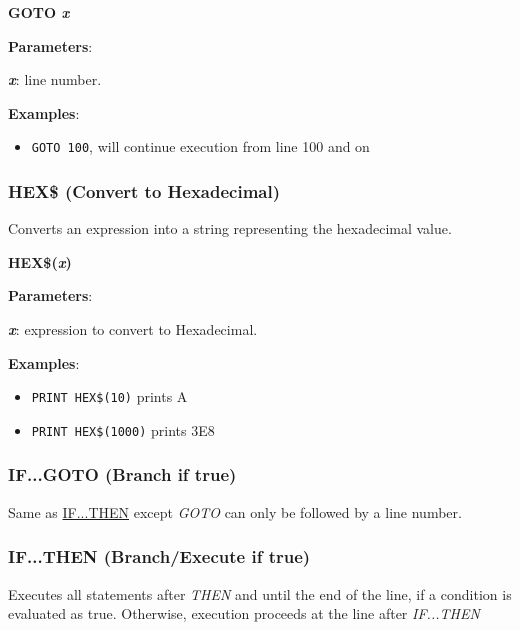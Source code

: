     \hspace{1.9cm}\textbf{GOTO \textit{x}}

    \textbf{Parameters}:

    \hspace{1cm}\textbf{\textit{x}}: line number.

    \textbf{Examples}:
    \begin{itemize}
        \item \texttt{GOTO 100}, will continue execution from line 100 and on
    \end{itemize}

    \subsubsection{{HEX\$ (Convert to Hexadecimal)}}
    \label{msbasic:lang:hex}
    Converts an expression into a string representing the hexadecimal value.

    \hspace{1.9cm}\textbf{HEX\$(\textit{x})}

    \textbf{Parameters}:

    \hspace{1cm}\textbf{\textit{x}}: expression to convert to Hexadecimal.

    \textbf{Examples}:
    \begin{itemize}
        \item \texttt{PRINT HEX\$(10)} prints A
        \item \texttt{PRINT HEX\$(1000)} prints 3E8
    \end{itemize}


    \subsubsection{{IF...GOTO (Branch if true)}}
    \label{msbasic:lang:ifgoto}
    Same as \hyperref[msbasic:lang:ifthen]{IF...THEN} except \textit{GOTO} can
    only be followed by a line number.

    \subsubsection{{IF...THEN (Branch/Execute if true)}}
    \label{msbasic:lang:ifthen}
    Executes all statements after \textit{THEN} and until the end of the line,
    if a condition is evaluated as true. Otherwise, execution proceeds at the
    line after \textit{IF...THEN}

